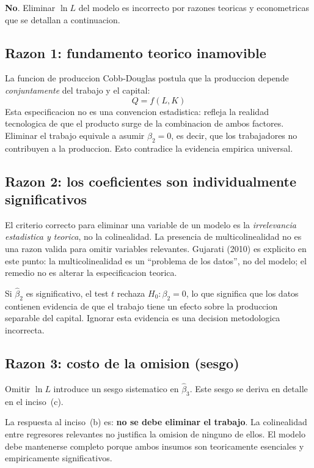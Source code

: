 \documentclass[12pt, letterpaper]{article}
\theoremstyle{remark}
\begin{document}
\textbf{No}. Eliminar $\ln L$ del modelo es incorrecto por razones teoricas
y econometricas que se detallan a continuacion.

\subsection{Razon 1: fundamento teorico inamovible}

La funcion de produccion Cobb-Douglas postula que la produccion depende
\emph{conjuntamente} del trabajo y el capital:
\begin{equation}
  Q = f(L, K)
  \label{eq:produccion}
\end{equation}
Esta especificacion no es una convencion estadistica: refleja la realidad
tecnologica de que el producto surge de la combinacion de ambos factores.
Eliminar el trabajo equivale a asumir $\beta_2 = 0$, es decir, que los
trabajadores no contribuyen a la produccion. Esto contradice la evidencia
empirica universal.

\subsection{Razon 2: los coeficientes son individualmente significativos}

El criterio correcto para eliminar una variable de un modelo es la
\emph{irrelevancia estadistica y teorica}, no la colinealidad. La presencia
de multicolinealidad no es una razon valida para omitir variables relevantes.
Gujarati (2010) es explicito en este punto: la multicolinealidad es un
``problema de los datos'', no del modelo; el remedio no es alterar la
especificacion teorica.

Si $\hat\beta_2$ es significativo, el test $t$ rechaza $H_0: \beta_2 = 0$,
lo que significa que los datos contienen evidencia de que el trabajo tiene
un efecto sobre la produccion separable del capital. Ignorar esta evidencia
es una decision metodologica incorrecta.

\subsection{Razon 3: costo de la omision (sesgo)}

Omitir $\ln L$ introduce un sesgo sistematico en $\hat\beta_3$. Este sesgo
se deriva en detalle en el inciso~(c).

\begin{clave}
  La respuesta al inciso~(b) es: \textbf{no se debe eliminar el trabajo}.
  La colinealidad entre regresores relevantes no justifica la omision de
  ninguno de ellos. El modelo debe mantenerse completo porque ambos insumos
  son teoricamente esenciales y empiricamente significativos.
\end{clave}
\end{document}
